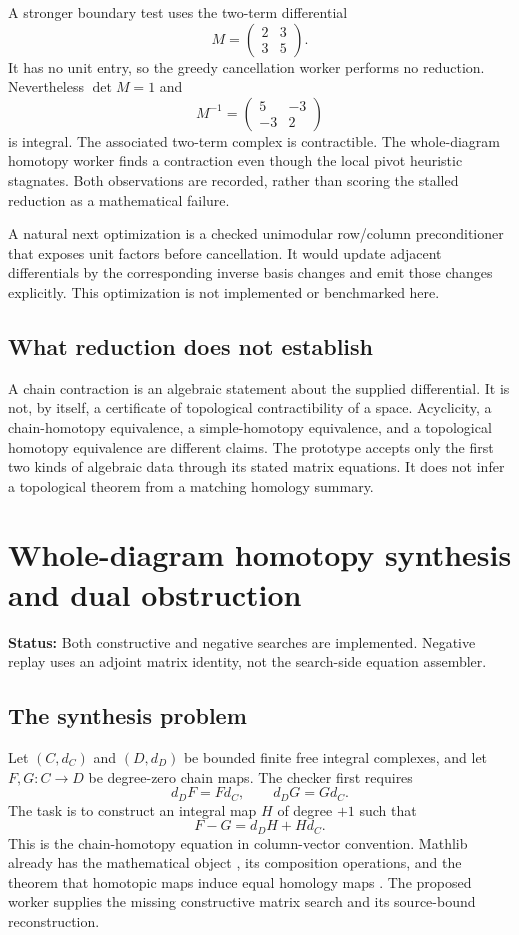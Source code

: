 \documentclass[11pt,letterpaper]{article}
\theoremstyle{definition}\newtheorem{definition}[theorem]{Definition}
\theoremstyle{remark}\newtheorem{remark}[theorem]{Remark}
\newcommand{\code}[1]{\texttt{\detokenize{#1}}}
\newcommand{\status}[1]{\par\smallskip\textsf{\textbf{Status:} #1}\par\smallskip}
\begin{document}
A stronger boundary test uses the two-term differential
\[
 M=\begin{pmatrix}2&3\\3&5\end{pmatrix}.
\]
It has no unit entry, so the greedy cancellation worker performs no reduction.
Nevertheless $\det M=1$ and
\[
 M^{-1}=\begin{pmatrix}5&-3\\-3&2\end{pmatrix}
\]
is integral. The associated two-term complex is contractible. The whole-diagram
homotopy worker finds a contraction even though the local pivot heuristic
stagnates. Both observations are recorded, rather than scoring the stalled
reduction as a mathematical failure.

A natural next optimization is a checked unimodular row/column preconditioner
that exposes unit factors before cancellation. It would update adjacent
differentials by the corresponding inverse basis changes and emit those
changes explicitly. This optimization is not implemented or benchmarked here.

\subsection{What reduction does not establish}
A chain contraction is an algebraic statement about the supplied differential.
It is not, by itself, a certificate of topological contractibility of a space.
Acyclicity, a chain-homotopy equivalence, a simple-homotopy equivalence, and a
topological homotopy equivalence are different claims. The prototype accepts
only the first two kinds of algebraic data through its stated matrix equations.
It does not infer a topological theorem from a matching homology summary.

\section{Whole-diagram homotopy synthesis and dual obstruction}
\label{sec:homotopy}
\status{Both constructive and negative searches are implemented. Negative
replay uses an adjoint matrix identity, not the search-side equation assembler.}

\subsection{The synthesis problem}
Let $(C,d_C)$ and $(D,d_D)$ be bounded finite free integral complexes, and let
$F,G:C\to D$ be degree-zero chain maps. The checker first requires
\[
 d_DF=Fd_C,\qquad d_DG=Gd_C.
\]
The task is to construct an integral map $H$ of degree $+1$ such that
\begin{equation}\label{eq:homotopy}
 F-G=d_DH+Hd_C.
\end{equation}
This is the chain-homotopy equation in column-vector convention. Mathlib
already has the mathematical object \code{Homotopy}, its composition
operations, and the theorem that homotopic maps induce equal homology maps
\cite{mathlib-homotopy}. The proposed worker supplies the missing constructive
matrix search and its source-bound reconstruction.
\end{document}
